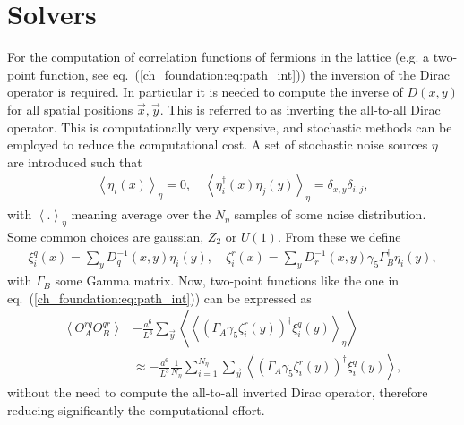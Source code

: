 
\chapter{Solvers}
\label{appex_solvers}

For the computation of correlation functions of fermions in the lattice (e.g. a two-point function, see eq.~(\ref{ch_foundation:eq:path_int})) the inversion of the Dirac operator is required. In particular it is needed to compute the inverse of $D(x,y)$ for all spatial positions $\vec{x},\vec{y}$. This is referred to as inverting the all-to-all Dirac operator. This is computationally very expensive, and stochastic methods can be employed to reduce the computational cost. A set of stochastic noise sources $\eta$ are introduced such that
\begin{gather}
\left<\eta_i(x)\right>_{\eta}=0, \quad \left<\eta_i^{\dagger}(x)\eta_j(y)\right>_{\eta}=\delta_{x,y}\delta_{i,j},
\end{gather}
with $\left<.\right>_{\eta}$ meaning average over the $N_{\eta}$ samples of some noise distribution. Some common choices are gaussian, $Z_2$ or $U(1)$. From these we define
\begin{gather}
\xi_i^q(x)=\sum_yD^{-1}_q(x,y)\eta_i(y), \quad \zeta_i^r(x)=\sum_yD^{-1}_r(x,y)\gamma_5\Gamma_B^{\dagger}\eta_i(y),
\end{gather}
with $\Gamma_B$ some Gamma matrix. Now, two-point functions like the one in eq.~(\ref{ch_foundation:eq:path_int})) can be expressed as
\begin{align}
\left<O^{rq}_AO^{qr}_B\right>&-\frac{a^6}{L^3}\sum_{\vec{y}}\left<\left<(\Gamma_A\gamma_5\zeta^r_i(y))^{\dagger}\xi^q_i(y)\right>_{\eta}\right> \\
&\approx -\frac{a^6}{L^3}\frac{1}{N_{\eta}}\sum_{i=1}^{N_{\eta}}\sum_{\vec{y}}\left<(\Gamma_A\gamma_5\zeta^r_i(y))^{\dagger}\xi^q_i(y)\right>,
\end{align}
without the need to compute the all-to-all inverted Dirac operator, therefore reducing significantly the computational effort.

